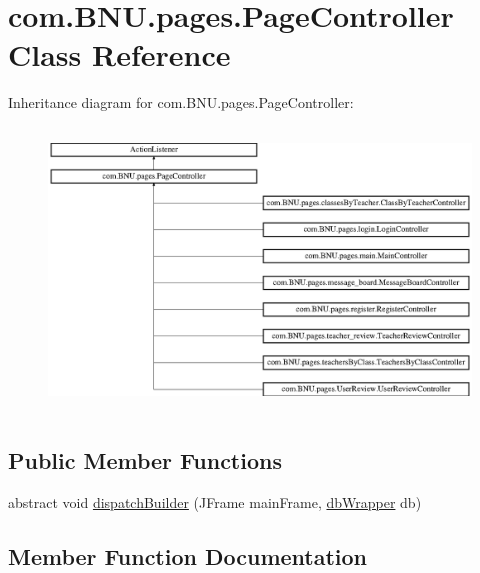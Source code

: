 \hypertarget{classcom_1_1_b_n_u_1_1pages_1_1_page_controller}{}\section{com.\+B\+N\+U.\+pages.\+Page\+Controller Class Reference}
\label{classcom_1_1_b_n_u_1_1pages_1_1_page_controller}
Inheritance diagram for com.\+B\+N\+U.\+pages.\+Page\+Controller\+:\begin{figure}[H]
\begin{center}
\leavevmode
\includegraphics[height=7.547170cm]{classcom_1_1_b_n_u_1_1pages_1_1_page_controller}
\end{center}
\end{figure}
\subsection*{Public Member Functions}
\begin{DoxyCompactItemize}
\item 
abstract void \mbox{\hyperlink{classcom_1_1_b_n_u_1_1pages_1_1_page_controller_ac5661bb6bbf44bd301c731d98fbf2bb6}{dispatch\+Builder}} (J\+Frame main\+Frame, \mbox{\hyperlink{interfacecom_1_1_b_n_u_1_1database_1_1db_wrapper}{db\+Wrapper}} db)
\end{DoxyCompactItemize}


\subsection{Member Function Documentation}
\mbox{\label{classcom_1_1_b_n_u_1_1pages_1_1_page_controller_ac5661bb6bbf44bd301c731d98fbf2bb6}} 
